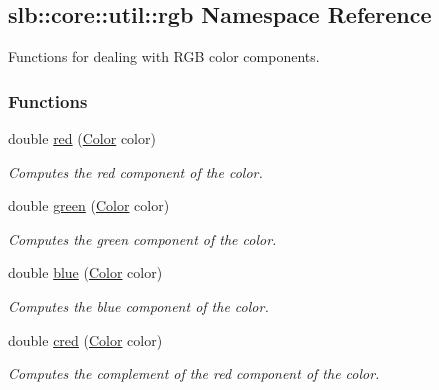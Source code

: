 \hypertarget{namespaceslb_1_1core_1_1util_1_1rgb}{}\subsection{slb\+:\+:core\+:\+:util\+:\+:rgb Namespace Reference}
\label{namespaceslb_1_1core_1_1util_1_1rgb}


Functions for dealing with R\+GB color components.  


\subsubsection*{Functions}
\begin{DoxyCompactItemize}
\item 
double \hyperlink{namespaceslb_1_1core_1_1util_1_1rgb_a57ef22044d0e96a852e30686ad0ce0b9}{red} (\hyperlink{namespaceslb_1_1core_1_1util_afae144e1a65658559242f5cf4fce426f}{Color} color)
\begin{DoxyCompactList}\small\item\em Computes the red component of the color. \end{DoxyCompactList}\item 
double \hyperlink{namespaceslb_1_1core_1_1util_1_1rgb_a8d76b8445a2a7f23aa9216e985f4c9b3}{green} (\hyperlink{namespaceslb_1_1core_1_1util_afae144e1a65658559242f5cf4fce426f}{Color} color)
\begin{DoxyCompactList}\small\item\em Computes the green component of the color. \end{DoxyCompactList}\item 
double \hyperlink{namespaceslb_1_1core_1_1util_1_1rgb_a5584464a49d0bed3b915ff7b06142d19}{blue} (\hyperlink{namespaceslb_1_1core_1_1util_afae144e1a65658559242f5cf4fce426f}{Color} color)
\begin{DoxyCompactList}\small\item\em Computes the blue component of the color. \end{DoxyCompactList}\item 
double \hyperlink{namespaceslb_1_1core_1_1util_1_1rgb_a6c08830a72ab29ca0800c658d235d498}{cred} (\hyperlink{namespaceslb_1_1core_1_1util_afae144e1a65658559242f5cf4fce426f}{Color} color)
\begin{DoxyCompactList}\small\item\em Computes the complement of the red component of the color. \end{DoxyCompactList}\item 

\end{DoxyCompactItemize}
